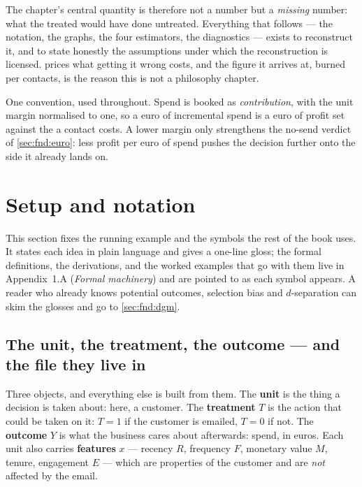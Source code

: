 The chapter's central quantity is therefore not a number but a \emph{missing} number: what
the treated would have done untreated. Everything that follows --- the notation, the graphs,
the four estimators, the diagnostics --- exists to reconstruct it, and to state honestly the
assumptions under which the reconstruction is licensed.  prices what
getting it wrong costs, and the figure it arrives at, \eur{\nbZeroPolBurn} burned per
\nbZeroNCustomers{} contacts, is the reason this is not a philosophy chapter.

One convention, used throughout. Spend is booked as \emph{contribution}, with the unit margin
normalised to one, so a euro of incremental spend is a euro of profit set against the
\eur{\nbZeroCost} a contact costs. A lower margin only strengthens the no-send verdict of
\cref{sec:fnd:euro}: less profit per euro of spend pushes the decision further onto the side it
already lands on.

\section{Setup and notation}
\label{sec:fnd:vocab}

This section fixes the running example and the symbols the rest of the book uses. It states
each idea in plain language and gives a one-line gloss; the formal definitions, the derivations,
and the worked examples that go with them live in Appendix~1.A (\emph{Formal machinery}) and are
pointed to as each symbol appears. A reader who already knows potential outcomes, selection bias
and $d$-separation can skim the glosses and go to \cref{sec:fnd:dgm}.

\subsection*{The unit, the treatment, the outcome --- and the file they live in}

Three objects, and everything else is built from them. The \textbf{unit} is the thing a
decision is taken about: here, a customer. The \textbf{treatment} $T$ is the action that could
be taken on it: $T = 1$ if the customer is emailed, $T = 0$ if not. The \textbf{outcome} $Y$
is what the business cares about afterwards: spend, in euros. Each unit also carries
\textbf{features} $x$ --- recency $R$, frequency $F$, monetary value $M$, tenure, engagement
$E$ --- which are properties of the customer and are \emph{not} affected by the email.

